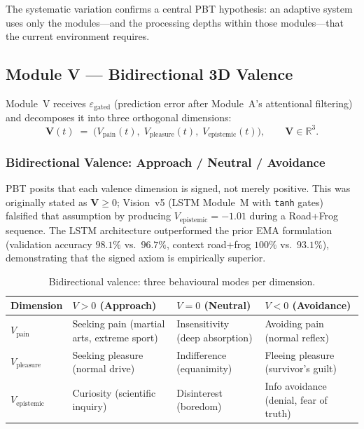 \documentclass[12pt,a4paper]{article}
\newcommand{\vpain}{V_{\mathrm{pain}}}
\newcommand{\vpleasure}{V_{\mathrm{pleasure}}}
\newcommand{\vepi}{V_{\mathrm{epistemic}}}
\begin{document}
The systematic variation confirms a central PBT hypothesis: an adaptive system
uses only the modules---and the processing depths within those modules---that
the current environment requires.

\subsection{Module V --- Bidirectional 3D Valence}

Module~V receives $\varepsilon_{\mathrm{gated}}$ (prediction error after
Module~A's attentional filtering) and decomposes it into three orthogonal
dimensions:
\begin{equation}
  \mathbf{V}(t) \;=\; \bigl(\vpain(t),\;\vpleasure(t),\;\vepi(t)\bigr),
  \qquad \mathbf{V}\in\mathbb{R}^3.
  \label{eq:valence}
\end{equation}

\subsubsection{Bidirectional Valence: Approach / Neutral / Avoidance}

PBT posits that each valence dimension is signed, not merely positive. This was
originally stated as $\mathbf{V}\ge 0$; Vision~v5 (LSTM Module~M with
\texttt{tanh} gates) falsified that assumption by producing
$\vepi = -1.01$ during a Road+Frog sequence. The LSTM architecture outperformed
the prior EMA formulation (validation accuracy $98.1\%$ vs.\ $96.7\%$,
context road+frog $100\%$ vs.\ $93.1\%$), demonstrating that the signed axiom
is empirically superior.

\begin{table}[ht]
\centering
\caption{Bidirectional valence: three behavioural modes per dimension.}
\label{tab:bidirectional}
\small
\begin{tabular}{@{}L{1.8cm}L{4.0cm}L{3.4cm}L{3.4cm}@{}}
\toprule
\textbf{Dimension} & \textbf{$V > 0$ (Approach)}
  & \textbf{$V = 0$ (Neutral)} & \textbf{$V < 0$ (Avoidance)} \\
\midrule
$\vpain$ &
  Seeking pain (martial arts, extreme sport) &
  Insensitivity (deep absorption) &
  Avoiding pain (normal reflex) \\
$\vpleasure$ &
  Seeking pleasure (normal drive) &
  Indifference (equanimity) &
  Fleeing pleasure (survivor's guilt) \\
$\vepi$ &
  Curiosity (scientific inquiry) &
  Disinterest (boredom) &
  Info avoidance (denial, fear of truth) \\
\bottomrule
\end{tabular}
\end{table}
\end{document}
